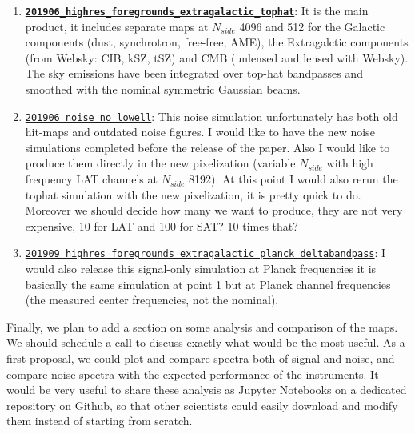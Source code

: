 \documentclass{article}
\begin{document}
\begin{enumerate}
\item \href{https://github.com/simonsobs/map_based_simulations/tree/master/201906_highres_foregrounds_extragalactic_tophat}{\textbf{\texttt{201906\_highres\_foregrounds\_extragalactic\_tophat}}}: It is the main product, it includes separate maps at $N_{side}$ 4096 and 512 for the Galactic components (dust, synchrotron, free-free, AME), the Extragalctic components (from Websky: CIB, kSZ, tSZ) and CMB (unlensed and lensed with Websky). The sky emissions have been integrated over top-hat bandpasses and smoothed with the nominal symmetric Gaussian beams.
\item \href{https://github.com/simonsobs/map_based_simulations/tree/master/201906_noise_no_lowell}{\texttt{201906\_noise\_no\_lowell}}:
  This noise simulation unfortunately     has both old hit-maps and outdated noise figures. I would like to have
  the new noise simulations completed before the release of the paper. Also I would like to produce them directly in the new pixelization (variable $N_{side}$ with high frequency LAT channels at $N_{side}$ 8192). At
  this point I would also rerun the tophat simulation with the   new pixelization, it is pretty quick to do. Moreover we should decide how many we want to produce, they are not very expensive, 10 for LAT and 100 for SAT? 10 times that?
\item \href{https://github.com/simonsobs/map_based_simulations/tree/master/201909_highres_foregrounds_extragalactic_planck_deltabandpass}{\texttt{201909\_highres\_foregrounds\_extragalactic\_planck\_deltabandpass}}:
  I would also release this signal-only simulation at Planck frequencies
  it is basically the same simulation at point 1 but at Planck channel frequencies (the measured center frequencies, not the nominal).
\end{enumerate}

Finally, we plan to add a section on some analysis and comparison of the maps. We should schedule a call to discuss exactly what would be the most useful. As a first proposal, we could plot and compare spectra both of signal and noise, and compare noise spectra with the expected performance of the instruments. It would be very useful to share these analysis as Jupyter Notebooks on a dedicated repository on Github, so that other scientists could easily download and modify them instead of starting from scratch.
\end{document}
